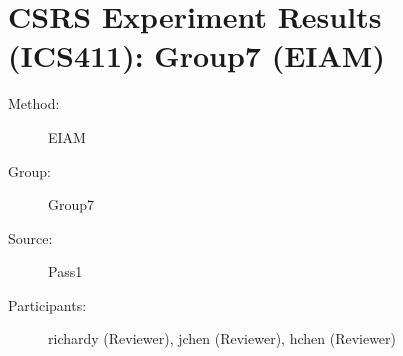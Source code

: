 \chapter {CSRS Experiment Results (ICS411): Group7 (EIAM)}
\small

\begin{description}
\item [Method:] EIAM
\item [Group:] Group7
\item [Source:] Pass1
\item [Participants:] richardy (Reviewer), jchen (Reviewer), hchen (Reviewer)
\end{description}
